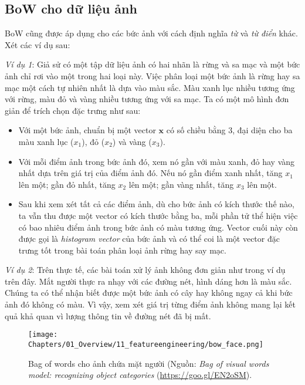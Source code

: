\subsection{BoW cho dữ liệu ảnh}
BoW cũng được áp dụng cho các bức ảnh với cách định nghĩa \textit{từ} và
\textit{từ điển} khác. Xét các ví dụ sau:

\textit{Ví dụ 1}: Giả sử có một tập dữ liệu ảnh có hai nhãn là rừng và sa mạc và một bức ảnh chỉ rơi vào một trong hai loại này. Việc phân
loại một bức ảnh là rừng hay sa mạc một cách tự nhiên nhất là dựa vào màu sắc.
Màu xanh lục nhiều tương ứng với rừng, màu đỏ và vàng nhiều tương ứng với sa mạc. Ta có một mô hình đơn giản để trích chọn đặc trưng như sau:
\begin{itemize}
\item Với một bức ảnh, chuẩn bị một vector $\mathbf{x}$ có số chiều bằng 3,
đại diện cho ba màu xanh lục ($x_1$), đỏ ($x_2$) và vàng ($x_3$).

\item Với mỗi điểm ảnh trong bức ảnh đó, xem nó gần với màu xanh, đỏ hay
vàng nhất dựa trên giá trị của điểm ảnh đó. Nếu nó gần điểm xanh nhất, tăng
$x_1$ lên một; gần đỏ nhất, tăng $x_2$ lên một; gần vàng nhất, tăng $x_3$
lên một.

\item Sau khi xem xét tất cả các điểm ảnh, dù cho bức ảnh có kích thước thế
nào, ta vẫn thu được một vector có kích thước bằng ba, mỗi phần tử thể hiện
việc có bao nhiêu điểm ảnh trong bức ảnh có màu tương ứng. Vector cuối này còn
được gọi là \textit{histogram vector} của bức ảnh và có thể coi là một vector đặc trưng tốt trong bài toán phân loại
ảnh rừng hay say mạc.
\end{itemize}

\textit{Ví dụ 2}: Trên thực tế, các bài toán xử lý ảnh không đơn giản như trong
ví dụ trên đây. Mắt người thực ra nhạy với các đường nét, hình dáng hơn là màu
sắc. Chúng ta có thể nhận biết được một bức ảnh có cây hay không ngay cả khi bức
ảnh đó không có màu. Vì vậy, xem xét giá trị từng điểm ảnh không mang lại kết
quả khả quan vì lượng thông tin về đường nét đã bị mất.

\begin{figure}[t]
\centering
\texttt{[image: Chapters/01\_Overview/11\_featureengineering/bow\_face.png]}
\caption[]{Bag of words cho ảnh chứa mặt người (Nguồn: \textit{Bag of
visual words model: recognizing object categories}
(\url{https://goo.gl/EN2oSM}).}
\label{fig:11_2}
\end{figure}

